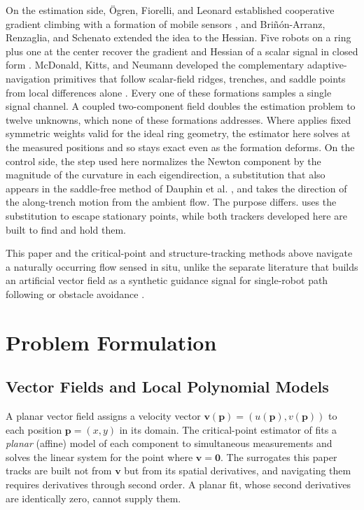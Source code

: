 \documentclass[lettersize,journal]{IEEEtran}
\begin{document}
On the estimation side, \"{O}gren, Fiorelli, and Leonard established
cooperative gradient climbing with a formation of mobile sensors
\cite{2}, and Bri\~{n}\'{o}n-Arranz, Renzaglia, and Schenato extended
the idea to the Hessian. Five robots on a ring plus one at the center
recover the gradient and Hessian of a scalar signal in closed form
\cite{6}. McDonald, Kitts, and Neumann developed the complementary
adaptive-navigation primitives that follow scalar-field ridges,
trenches, and saddle points from local differences alone
\cite{3,4,5}. Every one of these formations samples a single signal
channel. A coupled two-component field doubles the estimation problem
to twelve unknowns, which none of these formations addresses. Where
\cite{6} applies fixed symmetric weights valid
for the ideal ring geometry, the estimator here solves at the measured
positions and so stays exact even as the formation deforms. On the
control side, the step used here normalizes the Newton component by the
magnitude of the curvature in each eigendirection, a substitution that
also appears in the saddle-free method of Dauphin et al. \cite{34},
and takes the direction of the along-trench motion from the ambient
flow. The purpose differs. \cite{34} uses the substitution to escape
stationary points, while both trackers developed here are built to
find and hold them.

This paper and the critical-point and structure-tracking methods above
\cite{17,18,19,20,21,9} navigate a naturally occurring flow sensed in
situ, unlike the separate literature that builds an artificial vector
field as a synthetic guidance signal for single-robot path following
\cite{35} or obstacle avoidance \cite{36}.

\section{Problem Formulation}
\label{sec:detj_field}

\subsection{Vector Fields and Local Polynomial Models}

A planar vector field assigns a velocity vector $\mathbf{v}(\mathbf{p}) =
(u(\mathbf{p}), v(\mathbf{p}))$ to each position $\mathbf{p} = (x, y)$ in its
domain. The critical-point estimator of \cite{9} fits a \emph{planar}
(affine) model of each component to simultaneous measurements and solves
the linear system for the point where $\mathbf{v} = \mathbf{0}$. The
surrogates this paper tracks are built not from $\mathbf{v}$ but from its
spatial derivatives, and navigating them requires derivatives through
second order. A planar fit, whose second derivatives are identically zero,
cannot supply them.
\end{document}
